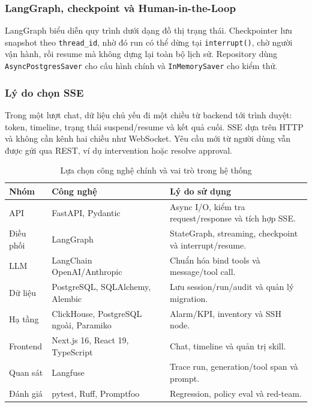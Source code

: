 \documentclass[12pt,a4paper]{article}
\begin{document}
\subsubsection{LangGraph, checkpoint và Human-in-the-Loop}
LangGraph biểu diễn quy trình dưới dạng đồ thị trạng thái. Checkpointer lưu snapshot theo \texttt{thread\_id}, nhờ đó run có thể dừng tại \texttt{interrupt()}, chờ người vận hành, rồi resume mà không dựng lại toàn bộ lịch sử. Repository dùng \texttt{AsyncPostgresSaver} cho cấu hình chính và \texttt{InMemorySaver} cho kiểm thử.

\subsubsection{Lý do chọn SSE}
Trong một lượt chat, dữ liệu chủ yếu đi một chiều từ backend tới trình duyệt: token, timeline, trạng thái suspend/resume và kết quả cuối. SSE dựa trên HTTP và không cần kênh hai chiều như WebSocket. Yêu cầu mới từ người dùng vẫn được gửi qua REST, ví dụ intervention hoặc resolve approval.

\begin{table}[H]
\centering
\caption{Lựa chọn công nghệ chính và vai trò trong hệ thống}
\label{tab:tech-stack}
\begin{tabularx}{\textwidth}{p{}p{}X}
\toprule
\textbf{Nhóm} & \textbf{Công nghệ} & \textbf{Lý do sử dụng} \\
\midrule
API & FastAPI, Pydantic & Async I/O, kiểm tra request/response và tích hợp SSE. \\
Điều phối & LangGraph & StateGraph, streaming, checkpoint và interrupt/resume. \\
LLM & LangChain OpenAI/Anthropic & Chuẩn hóa bind tools và message/tool call. \\
Dữ liệu & PostgreSQL, SQLAlchemy, Alembic & Lưu session/run/audit và quản lý migration. \\
Hạ tầng & ClickHouse, PostgreSQL ngoài, Paramiko & Alarm/KPI, inventory và SSH node. \\
Frontend & Next.js 16, React 19, TypeScript & Chat, timeline và quản trị skill. \\
Quan sát & Langfuse & Trace run, generation/tool span và prompt. \\
Đánh giá & pytest, Ruff, Promptfoo & Regression, policy eval và red-team. \\
\bottomrule
\end{tabularx}
\end{table}
\end{document}
